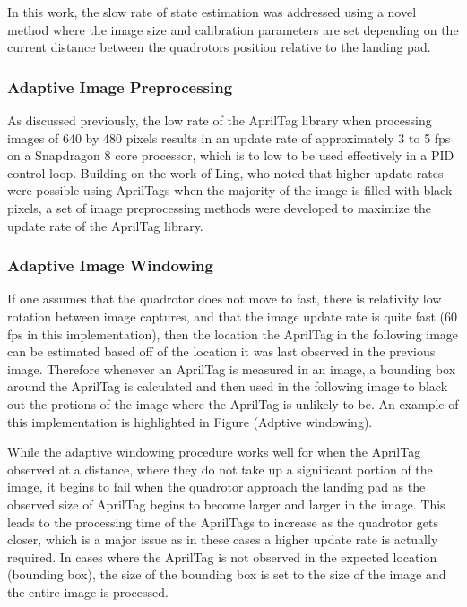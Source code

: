\documentclass[11pt, twocolumn]{article}
\begin{document}
In this work, the slow rate of state estimation was addressed using a novel method where the image size and calibration parameters are set depending on the current distance between the quadrotors position relative to the landing pad. 

\subsubsection{Adaptive Image Preprocessing}

As discussed previously, the low rate of the AprilTag library when processing images of 640 by 480 pixels results in an update rate of approximately 3 to 5 fps on a Snapdragon 8 core processor, which is to low to be used effectively in a PID control loop. Building on the work of Ling, who noted that higher update rates were possible using AprilTags when the majority of the image is filled with black pixels, a set of image preprocessing methods were developed to maximize the update rate of the AprilTag library. 

\subsubsection{Adaptive Image Windowing}

If one assumes that the quadrotor does not move to fast, there is relativity low rotation between image captures, and that the image update rate is quite fast (60 fps in this implementation), then the location the AprilTag in the following image can be estimated based off of the location it was last observed in the previous image. Therefore whenever an AprilTag is measured in an image, a bounding box around the AprilTag is calculated and then used in the following image to black out the protions of the image where the AprilTag is unlikely to be. An example of this implementation is highlighted in Figure (Adptive windowing).


While the adaptive windowing procedure works well for when the AprilTag observed at a distance, where they do not take up a significant portion of the image, it begins to fail when the quadrotor approach the landing pad as the observed size of AprilTag begins to become larger and larger in the  image. This leads to the processing time of the AprilTags to increase as the quadrotor gets closer, which is a major issue as in these cases a higher update rate is actually required. In cases where the AprilTag is not observed in the expected location (bounding box), the size of the bounding box is set to the size of the image and the entire image is processed. 
\end{document}
